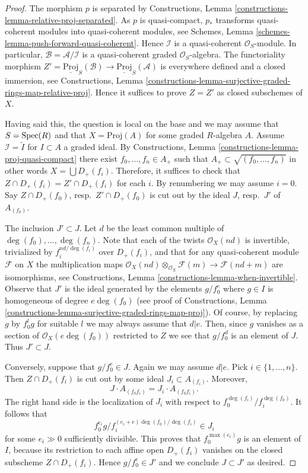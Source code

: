 \begin{proof}
The morphism $p$ is separated by
Constructions, Lemma \ref{constructions-lemma-relative-proj-separated}.
As $p$ is quasi-compact, $p_*$ transforms quasi-coherent modules
into quasi-coherent modules, see
Schemes, Lemma \ref{schemes-lemma-push-forward-quasi-coherent}.
Hence $\mathcal{I}$ is a quasi-coherent $\mathcal{O}_S$-module.
In particular, $\mathcal{B} = \mathcal{A}/\mathcal{I}$ is a
quasi-coherent graded $\mathcal{O}_S$-algebra. The functoriality
morphism $Z' = \underline{\text{Proj}}_S(\mathcal{B}) \to
\underline{\text{Proj}}_S(\mathcal{A})$ is everywhere defined and
a closed immersion, see Constructions, Lemma
\ref{constructions-lemma-surjective-graded-rings-map-relative-proj}.
Hence it suffices to prove $Z = Z'$ as closed subschemes of $X$.

\medskip\noindent
Having said this, the question is local on the base and we may assume
that $S = \mathop{\mathrm{Spec}}(R)$ and that $X = \text{Proj}(A)$ for some
graded $R$-algebra $A$. Assume $\mathcal{I} = \widetilde{I}$
for $I \subset A$ a graded ideal. By
Constructions, Lemma \ref{constructions-lemma-proj-quasi-compact}
there exist $f_0, \ldots, f_n \in A_{+}$ such that
$A_{+} \subset \sqrt{(f_0, \ldots, f_n)}$ in other words
$X = \bigcup D_{+}(f_i)$. Therefore, it suffices to check that
$Z \cap D_{+}(f_i) = Z' \cap D_{+}(f_i)$ for each $i$.
By renumbering we may assume $i = 0$.
Say $Z \cap D_{+}(f_0)$, resp.\ $Z' \cap D_{+}(f_0)$
is cut out by the ideal $J$, resp.\ $J'$ of $A_{(f_0)}$.

\medskip\noindent
The inclusion $J' \subset J$.
Let $d$ be the least common multiple of $\deg(f_0), \ldots, \deg(f_n)$.
Note that each of the twists $\mathcal{O}_X(nd)$ is invertible, trivialized
by $f_i^{nd/\deg(f_i)}$ over $D_{+}(f_i)$, and that for any quasi-coherent
module $\mathcal{F}$ on $X$ the multiplication maps
$\mathcal{O}_X(nd) \otimes_{\mathcal{O}_X} \mathcal{F}(m)
\to \mathcal{F}(nd + m)$ are isomorphisms, see
Constructions, Lemma \ref{constructions-lemma-when-invertible}.
Observe that $J'$ is the ideal generated by the elements $g/f_0^e$ where
$g \in I$ is homogeneous of degree $e\deg(f_0)$ (see proof of
Constructions, Lemma
\ref{constructions-lemma-surjective-graded-rings-map-proj}).
Of course, by replacing $g$ by $f_0^lg$ for suitable $l$
we may always assume that $d | e$. Then, since $g$ vanishes as a section of
$\mathcal{O}_X(e\deg(f_0))$ restricted to $Z$ we see that
$g/f_0^d$ is an element of $J$. Thus $J' \subset J$.

\medskip\noindent
Conversely, suppose that $g/f_0^e \in J$. Again we may assume $d | e$.
Pick $i \in \{1, \ldots, n\}$. Then $Z \cap D_{+}(f_i)$ is
cut out by some ideal $J_i \subset A_{(f_i)}$. Moreover,
$$
J \cdot A_{(f_0f_i)} = J_i \cdot A_{(f_0f_i)}.
$$
The right hand side is the localization of $J_i$ with respect to
$f_0^{\deg(f_i)}/f_i^{\deg(f_0)}$. It follows that
$$
f_0^{e_i}g/f_i^{(e_i + e)\deg(f_0)/\deg(f_i)} \in J_i
$$
for some $e_i \gg 0$ sufficiently divisible. This proves that
$f_0^{\max(e_i)}g$ is an element of $I$, because its restriction to each
affine open $D_{+}(f_i)$ vanishes on the closed subscheme
$Z \cap D_{+}(f_i)$. Hence $g/f_0^e \in J'$ and we conclude $J \subset J'$
as desired.
\end{proof}


